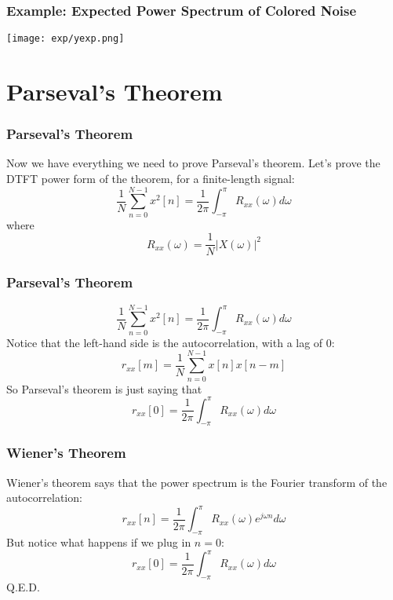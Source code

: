 \documentclass{beamer}
\begin{document}
\begin{frame}
  \frametitle{Example: Expected Power Spectrum of Colored Noise}
  
  \centerline{\texttt{[image: exp/yexp.png]}}
\end{frame}

\section[Parseval]{Parseval's Theorem}
\setcounter{subsection}{1}

\begin{frame}
  \frametitle{Parseval's Theorem}

  Now we have everything we need to prove Parseval's theorem.  Let's
  prove the DTFT power form of the theorem, for a finite-length
  signal:
  \begin{displaymath}
    \frac{1}{N}\sum_{n=0}^{N-1} x^2[n] = \frac{1}{2\pi}\int_{-\pi}^\pi R_{xx}(\omega)  d\omega
  \end{displaymath}
  where
  \begin{displaymath}
    R_{xx}(\omega) = \frac{1}{N}|X(\omega)|^2
  \end{displaymath}
\end{frame}

\begin{frame}
  \frametitle{Parseval's Theorem}

  \begin{displaymath}
    \frac{1}{N}\sum_{n=0}^{N-1} x^2[n] = \frac{1}{2\pi}\int_{-\pi}^\pi R_{xx}(\omega)  d\omega
  \end{displaymath}
  Notice that the left-hand side is the autocorrelation, with a lag of $0$:
  \begin{displaymath}
    r_{xx}[m] = \frac{1}{N}\sum_{n=0}^{N-1} x[n]x[n-m]
  \end{displaymath}
  So Parseval's theorem is just  saying that
  \begin{displaymath}
    r_{xx}[0] = \frac{1}{2\pi}\int_{-\pi}^\pi R_{xx}(\omega)  d\omega
  \end{displaymath}
\end{frame}

\begin{frame}
  \frametitle{Wiener's Theorem}

  Wiener's theorem says that the power spectrum is the Fourier
  transform of the autocorrelation:
  \begin{displaymath}
    r_{xx}[n] = \frac{1}{2\pi}\int_{-\pi}^\pi R_{xx}(\omega)e^{j\omega n}d\omega
  \end{displaymath}
  But notice what happens if we plug in $n=0$:
  \begin{displaymath}
    r_{xx}[0] = \frac{1}{2\pi}\int_{-\pi}^\pi R_{xx}(\omega)d\omega
  \end{displaymath}
  Q.E.D.
\end{frame}
\end{document}
